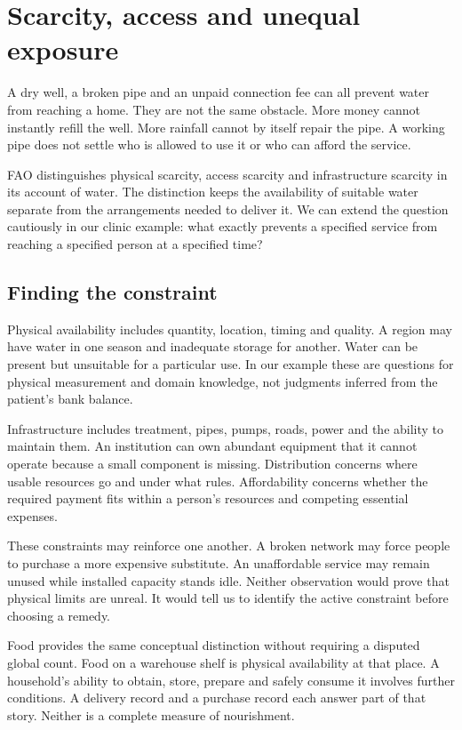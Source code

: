 \chapter{Scarcity, access and unequal exposure}\label{ch:access}

A dry well, a broken pipe and an unpaid connection fee can all prevent water from reaching a home. They are not the same obstacle. More money cannot instantly refill the well. More rainfall cannot by itself repair the pipe. A working pipe does not settle who is allowed to use it or who can afford the service.

FAO distinguishes physical scarcity, access scarcity and infrastructure scarcity in its account of water. The distinction keeps the availability of suitable water separate from the arrangements needed to deliver it.\cite{water} We can extend the question cautiously in our clinic example: what exactly prevents a specified service from reaching a specified person at a specified time?

\section{Finding the constraint}
Physical availability includes quantity, location, timing and quality. A region may have water in one season and inadequate storage for another. Water can be present but unsuitable for a particular use. In our example these are questions for physical measurement and domain knowledge, not judgments inferred from the patient's bank balance.

Infrastructure includes treatment, pipes, pumps, roads, power and the ability to maintain them. An institution can own abundant equipment that it cannot operate because a small component is missing. Distribution concerns where usable resources go and under what rules. Affordability concerns whether the required payment fits within a person's resources and competing essential expenses.

These constraints may reinforce one another. A broken network may force people to purchase a more expensive substitute. An unaffordable service may remain unused while installed capacity stands idle. Neither observation would prove that physical limits are unreal. It would tell us to identify the active constraint before choosing a remedy.

Food provides the same conceptual distinction without requiring a disputed global count. Food on a warehouse shelf is physical availability at that place. A household's ability to obtain, store, prepare and safely consume it involves further conditions. A delivery record and a purchase record each answer part of that story. Neither is a complete measure of nourishment.

